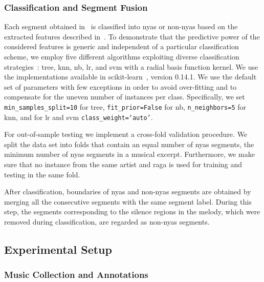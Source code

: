 {\subsubsection{Classification and Segment Fusion}

Each segment obtained in~ is classified into \gls{nyas} or non-\gls{nyas} based on the extracted features described in~. To demonstrate that the predictive power of the considered features is generic and independent of a particular classification scheme, we employ five different algorithms exploiting diverse classification strategies~\citep{Hastie09BOOK}: \gls{tree}, \gls{knn}, \gls{nb}, \gls{lr}, and \gls{svm} with a radial basis function kernel. We use the implementations available in scikit-learn~\citep{scikitlearn}, version 0.14.1. We use the default set of parameters with few exceptions in order to avoid over-fitting and to compensate for the uneven number of instances per class. Specifically, we set \texttt{min\_samples\_split=10} for \acrshort{tree}, \texttt{fit\_prior=False} for \gls{nb}, \texttt{n\_neighbors=5} for \gls{knn}, and for \gls{lr} and \gls{svm} \texttt{class\_weight=`auto'}.

For out-of-sample testing we implement a cross-fold validation procedure. We split the data set into folds that contain an equal number of \gls{nyas} segments, the minimum number of \gls{nyas} segments in a musical excerpt. Furthermore, we make sure that no instance from the same artist and \gls{raga} is used for training and testing in the same fold.

After classification, boundaries of \gls{nyas} and non-\gls{nyas} segments are obtained by merging all the consecutive segments with the same segment label. During this step, the segments corresponding to the silence regions in the melody, which were removed during classification, are regarded as non-\gls{nyas} segments.

\subsection{Experimental Setup}
\label{sec:pre_processing_nyas_segmentation_experimental_setup}

\subsubsection{Music Collection and Annotations}

}
